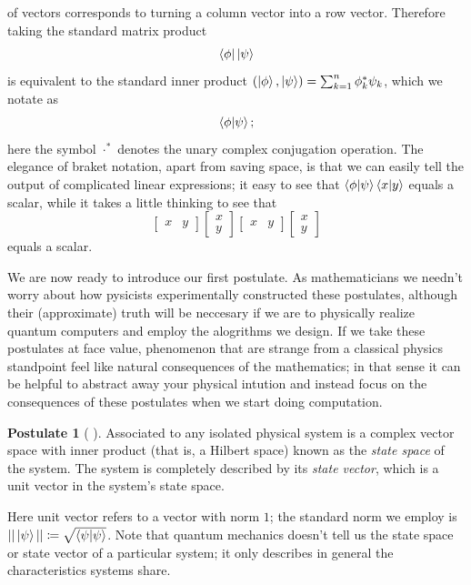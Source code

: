 \documentclass[12pt,twoside]{reedthesis}
\theoremstyle{plain}   %
\theoremstyle{definition}
\newtheorem{post}{Postulate}[section]
\theoremstyle{remark}
\numberwithin{equation}{section}
\begin{document}
  of vectors corresponds to turning a column vector into a row vector. Therefore taking the standard matrix product
  \[\bra{\phi} \ket{\psi}\]
  is equivalent to the standard inner product $(\ket{\phi}, \ket{\psi}) = \sum_{k=1}^n \phi_k^* \psi_k$, which we notate as
  \[\braket{\phi | \psi};\]
  here the symbol $\cdot^*$ denotes the unary complex conjugation operation.
  The elegance of braket notation, apart from saving space, is that we can easily tell the output of complicated linear expressions;
  it easy to see that $\braket{\phi | \psi} \braket{x | y}$ equals a scalar, while it takes a little thinking to see that
  \[
    \begin{bmatrix}
      x & y
    \end{bmatrix}
    \begin{bmatrix}
      x \\ y
    \end{bmatrix}
    \begin{bmatrix}
      x & y
    \end{bmatrix}
    \begin{bmatrix}
      x \\ y
    \end{bmatrix}
  \]
  equals a scalar.
  \par
  We are now ready to introduce our first postulate. As mathematicians we needn't worry about how pysicists experimentally constructed these postulates, although their
  (approximate) truth will be neccesary if we are to physically realize quantum computers and employ the alogrithms we design.
  If we take these postulates at face value, phenomenon that are strange from a classical physics standpoint feel like natural consequences of the mathematics;
  in that sense it can be helpful to abstract away your physical intution and instead focus on the consequences of these postulates when we start doing computation.
  \begin{post}[ {\cite[2.2.1]{nielsen2010}} ]
    Associated to any isolated physical system is a complex vector space
    with inner product (that is, a Hilbert space) known as the \emph{state space} of the
    system. The system is completely described by its \emph{state vector}, which is a unit
    vector in the system's state space.
  \end{post}
  Here unit vector refers to a vector with norm $1$; the standard norm we employ is $|| \ket{\psi} || \coloneq \sqrt{\braket{\psi| \psi}}$.
  Note that quantum mechanics doesn't tell us the state space or state vector of a particular system; it only describes in general the characteristics systems share.
\end{document}
